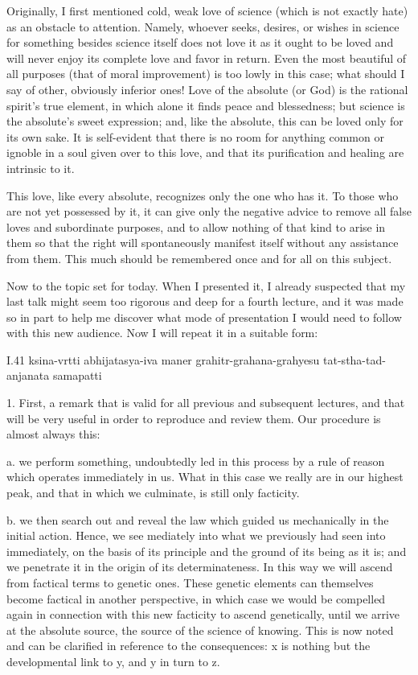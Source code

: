 Originally, I first mentioned cold, weak love of science
(which is not exactly hate) as an obstacle to attention.
Namely, whoever seeks, desires, or wishes in science
for something besides science itself does not love it
as it ought to be loved and will never enjoy
its complete love and favor in return.
Even the most beautiful of all purposes
(that of moral improvement)
is too lowly in this case;
what should I say of other, obviously inferior ones!
Love of the absolute (or God) is the rational spirit's true element,
in which alone it finds peace and blessedness;
but science is the absolute's sweet expression;
and, like the absolute, this can be loved only for its own sake.
It is self-evident that there is no room for anything
common or ignoble in a soul given over to this love,
and that its purification and healing are intrinsic to it.

This love, like every absolute,
recognizes only the one who has it.
To those who are not yet possessed by it,
it can give only the negative advice to remove
all false loves and subordinate purposes,
and to allow nothing of that kind to arise in them
so that the right will spontaneously manifest itself
without any assistance from them.
This much should be remembered
once and for all on this subject.

Now to the topic set for today.
When I presented it, I already suspected that
my last talk might seem too rigorous and
deep for a fourth lecture,
and it was made so in part to help me
discover what mode of presentation
I would need to follow with this new audience.
Now I will repeat it in a suitable form:

I.41
ksina-vrtti abhijatasya-iva maner
grahitr-grahana-grahyesu tat-stha-tad-anjanata samapatti

1. First, a remark that is valid
for all previous and subsequent lectures,
and that will be very useful in order
to reproduce and review them.
Our procedure is almost always this:

a. we perform something, undoubtedly led in this process
by a rule of reason which operates immediately in us.
What in this case we really are in our highest peak,
and that in which we culminate, is still only facticity.

b. we then search out and reveal the law
which guided us mechanically in the initial action.
Hence, we see mediately into what we previously
had seen into immediately,
on the basis of its principle
and the ground of its being as it is;
and we penetrate it in the origin
of its determinateness.
In this way we will ascend
from factical terms to genetic ones.
These genetic elements can themselves
become factical in another perspective,
in which case we would be compelled again
in connection with this new facticity
to ascend genetically,
until we arrive at the absolute source,
the source of the science of knowing.
This is now noted and can be clarified
in reference to the consequences:
x is nothing but the developmental link to y,
and y in turn to z.

